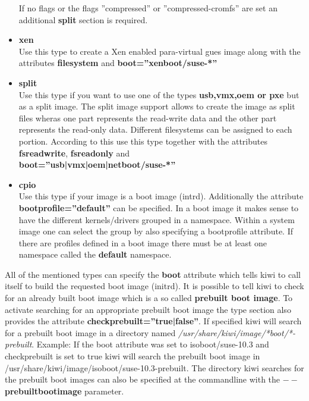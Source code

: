 \begin{itemize}
\begin{itemize}
      \end{itemize}
      If no flags or the flags ''compressed'' or ''compressed-cromfs''
      are set an additional \textbf{split} section is required.
\item \textbf{xen}\\
      Use this type to create a Xen enabled para-virtual gues image along
      with the attributes \textbf{filesystem} and
      \textbf{boot=''xenboot/suse-*''}
\item \textbf{split}\\
      Use this type if you want to use one of the types
      \textbf{usb,vmx,oem or pxe} but as a split image. The split image
      support allows to create the image as split files wheras one part
      represents the read-write data and the other part represents the
      read-only data. Different filesystems can be assigned to each portion.
      According to this use this type together with the attributes
      \textbf{fsreadwrite}, \textbf{fsreadonly} and\\
      \textbf{boot=''usb|vmx|oem|netboot/suse-*''}
\item \textbf{cpio}\\
      Use this type if your image is a boot image (intrd). Additionally
      the attribute \textbf{bootprofile=''default''} can be specified. In
      a boot image it makes sense to have the different kernels/drivers
      grouped in a namespace. Within a system image one can select the
      group by also specifying a bootprofile attribute. If there are profiles
      defined in a boot image there must be at least one namespace
      called the \textbf{default} namespace. 
\end{itemize}

All of the mentioned types can specify the \textbf{boot} attribute
which tells kiwi to call itself to build the requested boot image (initrd).
It is possible to tell kiwi to check for an already built boot image
which is a so called \textbf{prebuilt boot image}. To activate searching
for an appropriate prebuilt boot image the type section also provides the
attribute \textbf{checkprebuilt=''true|false''}. If specified kiwi will
search for a prebuilt boot image in a directory named
\textit{/usr/share/kiwi/image/*boot/*-prebuilt}. Example: If the boot
attribute was set to isoboot/suse-10.3 and checkprebuilt is set to true
kiwi will search the prebuilt boot image in
/usr/share/kiwi/image/isoboot/suse-10.3-prebuilt. The directory kiwi
searches for the prebuilt boot images can also be specified at the
commandline with the \textbf{$--$prebuiltbootimage} parameter.

